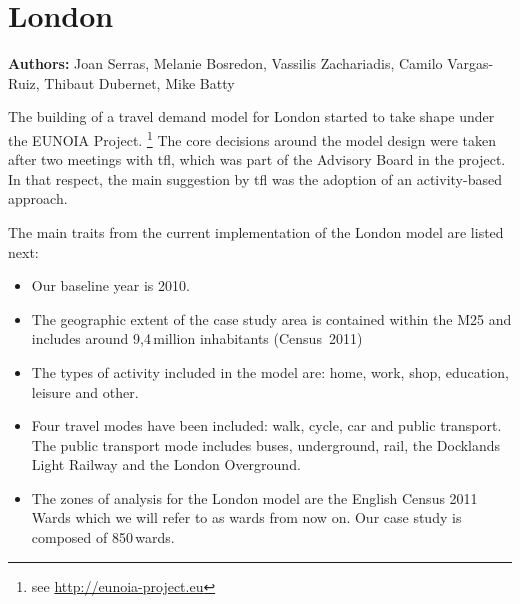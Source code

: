 \chapter{London}
\label{ch:london}
\hfill \textbf{Authors:} Joan Serras, Melanie Bosredon, Vassilis Zachariadis, Camilo Vargas-Ruiz, Thibaut Dubernet, Mike Batty


The building of a travel demand model for London started to take shape under the EUNOIA Project.
%
\footnote{see \url{http://eunoia-project.eu}} 
The core decisions around the model design were taken after two meetings with \gls{tfl}, which was part of the Advisory Board in the project. In that respect, the main suggestion by \gls{tfl} was the adoption of an activity-based approach.

The main traits from the current implementation of the London model are listed next:

\begin{itemize}\styleItemize
\item	Our baseline year is 2010.
\item	The geographic extent of the case study area is contained within the M25 and includes around 9,4\,million inhabitants (Census~2011)
\item	The types of activity included in the model are: home, work, shop, education, leisure and other.
\item	Four travel modes have been included: walk, cycle, car and public transport. The public transport mode includes buses, underground, rail, the Docklands Light Railway and the London Overground.
\item	The zones of analysis for the London model are the English Census 2011 Wards which we will refer to as wards from now on. Our case study is composed of 850\,wards.
\end{itemize}

%
